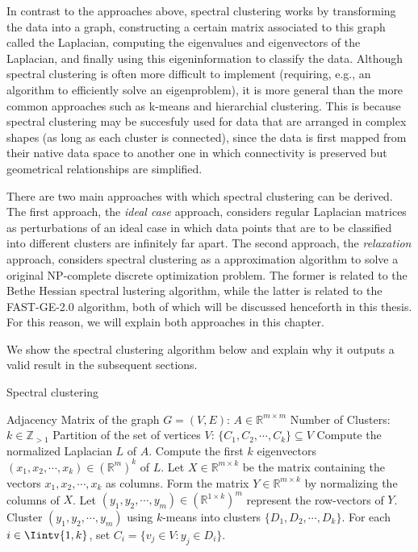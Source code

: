 In contrast to the approaches above, spectral clustering works by transforming the data into a graph, constructing a certain matrix associated to this graph called the Laplacian, computing the eigenvalues and eigenvectors of the Laplacian, and finally using this eigeninformation to classify the data.
Although spectral clustering is often more difficult to implement (requiring, e.g., an algorithm to efficiently solve an eigenproblem), it is more general than the more common approaches such as k-means and hierarchial clustering.
This is because spectral clustering may be succesfuly used for data that are arranged in complex shapes (as long as each cluster is connected), since the data is first mapped from their native data space to another one in which connectivity is preserved but geometrical relationships are simplified.

There are two main approaches with which spectral clustering can be derived.
The first approach, the \textit{ideal case} approach, considers regular Laplacian matrices as perturbations of an ideal case in which data points that are to be classified into different clusters are infinitely far apart.
The second approach, the \textit{relaxation} approach, considers spectral clustering as a approximation algorithm to solve a original NP-complete discrete optimization problem.
The former is related to the Bethe Hessian spectral lustering algorithm, while the latter is related to the FAST-GE-2.0 algorithm, both of which will be discussed henceforth in this thesis.
For this reason, we will explain both approaches in this chapter.

We show the spectral clustering algorithm below and explain why it outputs a valid result in the subsequent sections.

\begin{algorithm}
\caption{Spectral clustering}\label{spectral_clustering}
\begin{algorithmic}[1]
   \Require 
      \Statex Adjacency Matrix of the graph $G = (V,E)$: $A \in \mathbb R ^ {m \times m}$ 
      \Statex Number of Clusters: $k \in \mathbb Z_{>1}$
   \Ensure 
      \Statex Partition of the set of vertices $V$: $\{ C_1, C_2, \cdots, C_k \} \subseteq V$
      \vspace{0.2 cm}
   \State Compute the normalized Laplacian $L$ of $A$.
   \State Compute the first $k$ eigenvectors $(x_1, x_2, \cdots, x_k) \in (\mathbb R^{m})^k$ of $L$.
   \State Let $X \in \mathbb R^{m \times k}$ be the matrix containing the vectors $x_1, x_2, \cdots, x_k$ as columns.
   \State Form the matrix $Y \in \mathbb R^{m \times k}$ by normalizing the columns of $X$.
   \State Let $(y_1, y_2, \cdots, y_m) \in ( \mathbb R^{1 \times k} )^m$ represent the row-vectors of $Y$.
   \State Cluster $(y_1, y_2, \cdots, y_m)$ using $k$-means into clusters $\{ D_1, D_2, \cdots, D_k \} $.
   \State For each $i \in \Iintv{1,k}$, set $C_i = \{ v_j \in V: y_j \in D_i \}$.
\end{algorithmic}
\end{algorithm}




